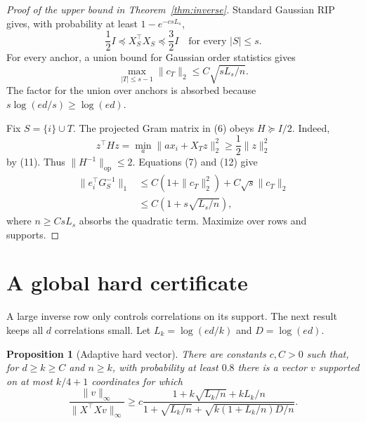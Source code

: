 \documentclass[twoside]{article}
\newtheorem{proposition}[theorem]{Proposition}
\begin{document}
\begin{proof}[Proof of the upper bound in Theorem~\ref{thm:inverse}]
Standard Gaussian RIP gives, with probability at least $1-e^{-csL_s}$,
\[
 \frac12I\preceq X_S^\top X_S\preceq\frac32I
 \quad\text{for every }|S|\leq s.
 \tag{11}
\]
For every anchor, a union bound for Gaussian order statistics gives
\[
 \max_{|T|\leq s-1}\|c_T\|_2
 \leq C\sqrt{sL_s/n}.
 \tag{12}
\]
The factor for the union over anchors is absorbed because
$s\log(ed/s)\geq\log(ed)$.

Fix $S=\{i\}\cup T$. The projected Gram matrix in (6) obeys
$H\succeq I/2$. Indeed,
\[
 z^\top Hz=\min_a\|a x_i+X_Tz\|_2^2
 \geq\frac12\|z\|_2^2
\]
by (11). Thus $\|H^{-1}\|_{\mathrm{op}}\leq2$. Equations (7) and (12) give
\begin{align*}
 \|e_i^\top G_S^{-1}\|_1
 &\leq C(1+\|c_T\|_2^2)
   +C\sqrt{s}\|c_T\|_2\\
 &\leq C(1+s\sqrt{L_s/n}),
\end{align*}
where $n\geq CsL_s$ absorbs the quadratic term. Maximize over rows and
supports.
\end{proof}

\section{A global hard certificate}
\label{sec:certificate}

A large inverse row only controls correlations on its support. The next result
keeps all $d$ correlations small. Let $L_k=\log(ed/k)$ and
$D=\log(ed)$.

\begin{proposition}[Adaptive hard vector]
\label{prop:certificate}
There are constants $c,C>0$ such that, for $d\geq k\geq C$ and $n\geq k$,
with probability at least $0.8$ there is a vector $v$ supported on at most
$k/4+1$ coordinates for which
\[
 \frac{\|v\|_\infty}{\|X^\top Xv\|_\infty}
 \geq
 c\frac{1+k\sqrt{L_k/n}+kL_k/n}
 {1+\sqrt{L_k/n}+\sqrt{k(1+L_k/n)D/n}}.
 \tag{13}
\]
\end{proposition}
\end{document}
